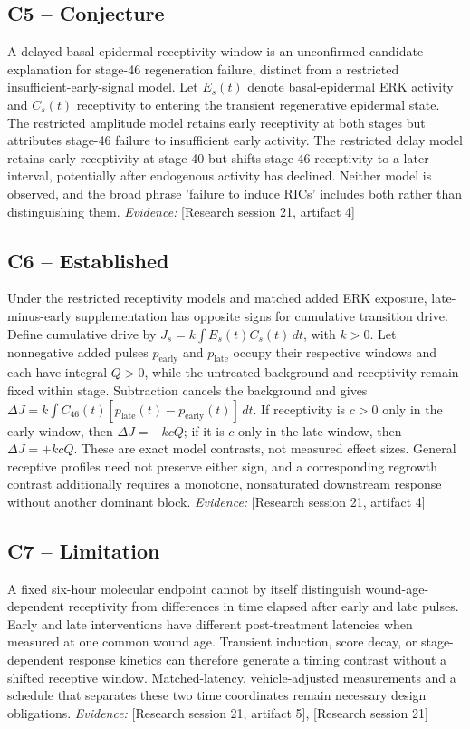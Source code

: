 \documentclass[11pt]{article}
\begin{document}
\subsection{C5 -- Conjecture}
A delayed basal-epidermal receptivity window is an unconfirmed candidate explanation for stage-46 regeneration failure, distinct from a restricted insufficient-early-signal model.
Let $E_s(t)$ denote basal-epidermal ERK activity and $C_s(t)$ receptivity to entering the transient regenerative epidermal state. The restricted amplitude model retains early receptivity at both stages but attributes stage-46 failure to insufficient early activity. The restricted delay model retains early receptivity at stage 40 but shifts stage-46 receptivity to a later interval, potentially after endogenous activity has declined. Neither model is observed, and the broad phrase 'failure to induce RICs' includes both rather than distinguishing them.
\textit{Evidence: }[Research session 21, artifact 4]
\subsection{C6 -- Established}
Under the restricted receptivity models and matched added ERK exposure, late-minus-early supplementation has opposite signs for cumulative transition drive.
Define cumulative drive by $J_s=k\int E_s(t)C_s(t)\,dt$, with $k>0$. Let nonnegative added pulses $p_{\mathrm{early}}$ and $p_{\mathrm{late}}$ occupy their respective windows and each have integral $Q>0$, while the untreated background and receptivity remain fixed within stage. Subtraction cancels the background and gives $\Delta J=k\int C_{46}(t)[p_{\mathrm{late}}(t)-p_{\mathrm{early}}(t)]\,dt$. If receptivity is $c>0$ only in the early window, then $\Delta J=-kcQ$; if it is $c$ only in the late window, then $\Delta J=+kcQ$. These are exact model contrasts, not measured effect sizes. General receptive profiles need not preserve either sign, and a corresponding regrowth contrast additionally requires a monotone, nonsaturated downstream response without another dominant block.
\textit{Evidence: }[Research session 21, artifact 4]
\subsection{C7 -- Limitation}
A fixed six-hour molecular endpoint cannot by itself distinguish wound-age-dependent receptivity from differences in time elapsed after early and late pulses.
Early and late interventions have different post-treatment latencies when measured at one common wound age. Transient induction, score decay, or stage-dependent response kinetics can therefore generate a timing contrast without a shifted receptive window. Matched-latency, vehicle-adjusted measurements and a schedule that separates these two time coordinates remain necessary design obligations.
\textit{Evidence: }[Research session 21, artifact 5], [Research session 21]
\end{document}
